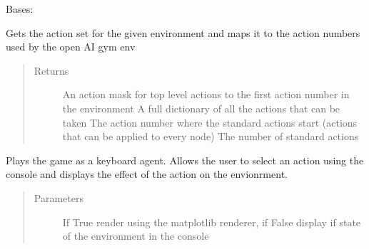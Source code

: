 \documentclass[letterpaper,10pt,english]{sphinxmanual}
\begin{document}
\begin{fulllineitems}
\label{\detokenize{source/yawning_titan.agents:yawning_titan.agents.keyboard_agent.KeyboardAgent}}
\sphinxAtStartPar
Bases: 

\begin{fulllineitems}
\label{\detokenize{source/yawning_titan.agents:yawning_titan.agents.keyboard_agent.KeyboardAgent.get_move_set}}
\sphinxAtStartPar
Gets the action set for the given environment and maps it to the action numbers used by the open AI gym env
\begin{quote}\begin{description}
\item[{Returns}] \leavevmode
\sphinxAtStartPar
An action mask for top level actions to the first action number in the environment
A full dictionary of all the actions that can be taken
The action number where the standard actions start (actions that can be applied to every node)
The number of standard actions

\end{description}\end{quote}

\end{fulllineitems}


\begin{fulllineitems}
\label{\detokenize{source/yawning_titan.agents:yawning_titan.agents.keyboard_agent.KeyboardAgent.play}}
\sphinxAtStartPar
Plays the game as a keyboard agent. Allows the user to select an action using the console and displays the
effect of the action on the envionrment.
\begin{quote}\begin{description}
\item[{Parameters}] \leavevmode
\sphinxAtStartPar
{} \textendash{} If True render using the matplotlib renderer, if False display if state of the
environment in the console


\end{description}
\end{quote}
\end{fulllineitems}
\end{fulllineitems}
\end{document}

